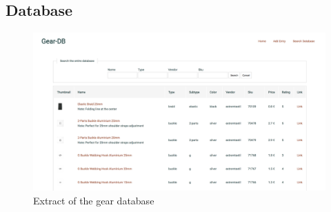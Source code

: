 \subsection{Database} \label{sec:gear-database}

\begin{figure}[H]
  \includegraphics[width=\textwidth]{media/images/gear-database}
  \caption{Extract of the gear database}
  \label{img:gear-database}
\end{figure}
